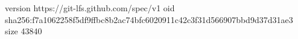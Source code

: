 version https://git-lfs.github.com/spec/v1
oid sha256:f7a1062258f5df9ffbc8b2ac74bfc6020911c42c3f31d566907bbd9d37d31ae3
size 43840
